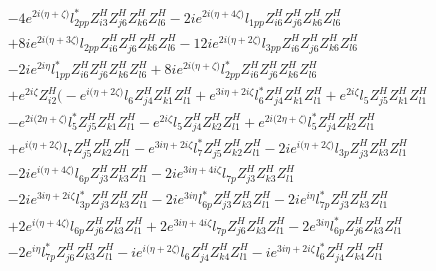  \begin{align} 
 & -4 e^{2 i \Big(\eta +\zeta \Big)} l_{2pp}^* Z_{{i 3}}^{H} Z_{{j 6}}^{H} Z_{{k 6}}^{H} Z_{{l 6}}^{H} -2 i e^{2 i \Big(\eta +4 \zeta \Big)} l_{1pp} Z_{{i 6}}^{H} Z_{{j 6}}^{H} Z_{{k 6}}^{H} Z_{{l 6}}^{H} \nonumber \\ 
 &+8 i e^{2 i \Big(\eta +3 \zeta \Big)} l_{2pp} Z_{{i 6}}^{H} Z_{{j 6}}^{H} Z_{{k 6}}^{H} Z_{{l 6}}^{H} -12 i e^{2 i \Big(\eta +2 \zeta \Big)} l_{3pp} Z_{{i 6}}^{H} Z_{{j 6}}^{H} Z_{{k 6}}^{H} Z_{{l 6}}^{H} \nonumber \\ 
 &-2 i e^{2 i \eta } l_{1pp}^* Z_{{i 6}}^{H} Z_{{j 6}}^{H} Z_{{k 6}}^{H} Z_{{l 6}}^{H} +8 i e^{2 i \Big(\eta +\zeta \Big)} l_{2pp}^* Z_{{i 6}}^{H} Z_{{j 6}}^{H} Z_{{k 6}}^{H} Z_{{l 6}}^{H} \nonumber \\ 
 &+e^{2 i \zeta } Z_{{i 2}}^{H} \Big(- e^{i \Big(\eta +2 \zeta \Big)} l_6 Z_{{j 4}}^{H} Z_{{k 1}}^{H} Z_{{l 1}}^{H} +e^{3 i \eta +2 i \zeta } l_6^* Z_{{j 4}}^{H} Z_{{k 1}}^{H} Z_{{l 1}}^{H} +e^{2 i \zeta } l_5 Z_{{j 5}}^{H} Z_{{k 1}}^{H} Z_{{l 1}}^{H} \nonumber \\ 
 &- e^{2 i \Big(2 \eta +\zeta \Big)} l_5^* Z_{{j 5}}^{H} Z_{{k 1}}^{H} Z_{{l 1}}^{H} - e^{2 i \zeta } l_5 Z_{{j 4}}^{H} Z_{{k 2}}^{H} Z_{{l 1}}^{H} +e^{2 i \Big(2 \eta +\zeta \Big)} l_5^* Z_{{j 4}}^{H} Z_{{k 2}}^{H} Z_{{l 1}}^{H} \nonumber \\ 
 &+e^{i \Big(\eta +2 \zeta \Big)} l_7 Z_{{j 5}}^{H} Z_{{k 2}}^{H} Z_{{l 1}}^{H} - e^{3 i \eta +2 i \zeta } l_7^* Z_{{j 5}}^{H} Z_{{k 2}}^{H} Z_{{l 1}}^{H} -2 i e^{i \Big(\eta +2 \zeta \Big)} l_{3p} Z_{{j 3}}^{H} Z_{{k 3}}^{H} Z_{{l 1}}^{H} \nonumber \\ 
 &-2 i e^{i \Big(\eta +4 \zeta \Big)} l_{6p} Z_{{j 3}}^{H} Z_{{k 3}}^{H} Z_{{l 1}}^{H} -2 i e^{3 i \eta +4 i \zeta } l_{7p} Z_{{j 3}}^{H} Z_{{k 3}}^{H} Z_{{l 1}}^{H} \nonumber \\ 
 &-2 i e^{3 i \eta +2 i \zeta } l_{3p}^* Z_{{j 3}}^{H} Z_{{k 3}}^{H} Z_{{l 1}}^{H} -2 i e^{3 i \eta } l_{6p}^* Z_{{j 3}}^{H} Z_{{k 3}}^{H} Z_{{l 1}}^{H} -2 i e^{i \eta } l_{7p}^* Z_{{j 3}}^{H} Z_{{k 3}}^{H} Z_{{l 1}}^{H} \nonumber \\ 
 &+2 e^{i \Big(\eta +4 \zeta \Big)} l_{6p} Z_{{j 6}}^{H} Z_{{k 3}}^{H} Z_{{l 1}}^{H} +2 e^{3 i \eta +4 i \zeta } l_{7p} Z_{{j 6}}^{H} Z_{{k 3}}^{H} Z_{{l 1}}^{H} -2 e^{3 i \eta } l_{6p}^* Z_{{j 6}}^{H} Z_{{k 3}}^{H} Z_{{l 1}}^{H} \nonumber \\ 
 &-2 e^{i \eta } l_{7p}^* Z_{{j 6}}^{H} Z_{{k 3}}^{H} Z_{{l 1}}^{H} -i e^{i \Big(\eta +2 \zeta \Big)} l_6 Z_{{j 4}}^{H} Z_{{k 4}}^{H} Z_{{l 1}}^{H} -i e^{3 i \eta +2 i \zeta } l_6^* Z_{{j 4}}^{H} Z_{{k 4}}^{H} Z_{{l 1}}^{H} \nonumber \\ 

\end{align}
